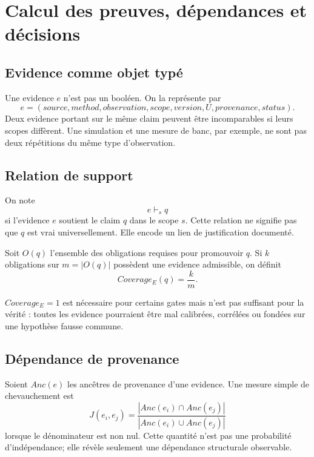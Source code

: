 \chapter{Calcul des preuves, dépendances et décisions}

\section{Evidence comme objet typé}

Une evidence $e$ n'est pas un booléen. On la représente par
\[
e=(source,method,observation,scope,version,U,provenance,status).
\]
Deux evidence portant sur le même claim peuvent être incomparables si leurs scopes diffèrent. Une simulation et une mesure de banc, par exemple, ne sont pas deux répétitions du même type d'observation.

\section{Relation de support}

On note
\[
e\vdash_s q
\]
si l'evidence $e$ soutient le claim $q$ dans le scope $s$. Cette relation ne signifie pas que $q$ est vrai universellement. Elle encode un lien de justification documenté.

\begin{definition}
Soit $O(q)$ l'ensemble des obligations requises pour promouvoir $q$. Si $k$ obligations sur $m=|O(q)|$ possèdent une evidence admissible, on définit
\[
Coverage_E(q)=\frac{k}{m}.
\]
\end{definition}

\begin{limitation}
$Coverage_E=1$ est nécessaire pour certains gates mais n'est pas suffisant pour la vérité : toutes les evidence pourraient être mal calibrées, corrélées ou fondées sur une hypothèse fausse commune.
\end{limitation}

\section{Dépendance de provenance}

Soient $Anc(e)$ les ancêtres de provenance d'une evidence. Une mesure simple de chevauchement est
\[
J(e_i,e_j)=\frac{|Anc(e_i)\cap Anc(e_j)|}{|Anc(e_i)\cup Anc(e_j)|}
\]
lorsque le dénominateur est non nul. Cette quantité n'est pas une probabilité d'indépendance; elle révèle seulement une dépendance structurale observable.

